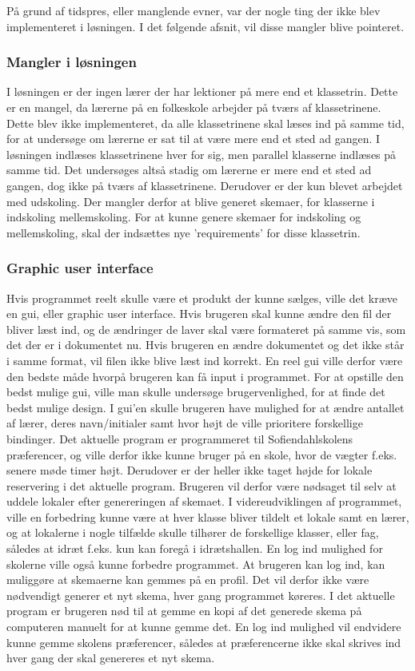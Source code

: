 På grund af tidspres, eller manglende evner, var der nogle ting der ikke blev implementeret i løsningen. I det følgende afsnit, vil disse mangler blive pointeret. 
\subsubsection{Mangler i løsningen}
I løsningen er der ingen lærer der har lektioner på mere end et klassetrin. Dette er en mangel, da lærerne på en folkeskole arbejder på tværs af klassetrinene. Dette blev ikke implementeret, da alle klassetrinene skal læses ind på samme tid, for at undersøge om lærerne er sat til at være mere end et sted ad gangen. I løsningen indlæses klassetrinene hver for sig, men parallel klasserne indlæses på samme tid. Det undersøges altså stadig om lærerne er mere end et sted ad gangen, dog ikke på tværs af klassetrinene. 
Derudover er der kun blevet arbejdet med udskoling. Der mangler derfor at blive generet skemaer, for klasserne i indskoling mellemskoling. For at kunne genere skemaer for indskoling og mellemskoling, skal der indsættes nye ’requirements’ for disse klassetrin.
\subsubsection{Graphic user interface}
Hvis programmet reelt skulle være et produkt der kunne sælges, ville det kræve en gui, eller graphic user interface. Hvis brugeren skal kunne ændre den fil der bliver læst ind, og de ændringer de laver skal være formateret på samme vis, som det der er i dokumentet nu. Hvis brugeren en ændre dokumentet og det ikke står i samme format, vil filen ikke blive læst ind korrekt. En reel gui ville derfor være den bedste måde hvorpå brugeren kan få input i programmet. For at opstille den bedst mulige gui, ville man skulle undersøge brugervenlighed, for at finde det bedst mulige design. I gui’en skulle brugeren have mulighed for at ændre antallet af lærer, deres navn/initialer samt hvor højt de ville prioritere forskellige bindinger. 
Det aktuelle program er programmeret til Sofiendahlskolens præferencer, og ville derfor ikke kunne bruger på en skole, hvor de vægter f.eks. senere møde timer højt. 
Derudover er der heller ikke taget højde for lokale reservering i det aktuelle program. Brugeren vil derfor være nødsaget til selv at uddele lokaler efter genereringen af skemaet. I videreudviklingen af programmet, ville en forbedring kunne være at hver klasse bliver tildelt et lokale samt en lærer, og at lokalerne i nogle tilfælde skulle tilhører de forskellige klasser, eller fag, således at idræt f.eks. kun kan foregå i idrætshallen. 
En log ind mulighed for skolerne ville også kunne forbedre programmet. At brugeren kan log ind, kan muliggøre at skemaerne kan gemmes på en profil. Det vil derfor ikke være nødvendigt generer et nyt skema, hver gang programmet køreres. I det aktuelle program er brugeren nød til at gemme en kopi af det generede skema på computeren manuelt for at kunne gemme det. En log ind mulighed vil endvidere kunne gemme skolens præferencer, således at præferencerne ikke skal skrives ind hver gang der skal genereres et nyt skema. 
